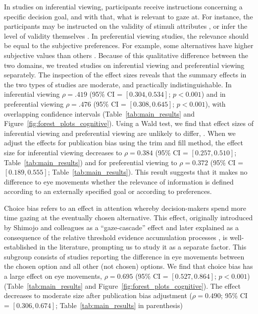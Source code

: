 \documentclass[english,natbib,man,floatsintext]{apa6}
\begin{document}
In studies on inferential viewing, participants receive instructions concerning a specific decision goal, and with that, what is relevant to gaze at. For instance, the participants may be instructed on the validity of stimuli attributes \citep{krefeld-schwalb2019a}, or infer the level of validity themselves \citep{bialkova2014a}. In preferential viewing studies, the relevance should be equal to the subjective preferences. For example, some alternatives have higher subjective values than others \citep{kim2012a}. Because of this qualitative difference between the two domains, we treated studies on inferential viewing and preferential viewing separately. The inspection of the effect sizes reveals that the summary effects in the two types of studies are moderate, and practically indistinguishable. In inferential viewing $\rho = .419$ (95\% CI = $[0.304,0.534]$; $p<0.001$) and in preferential viewing $\rho = .476$ (95\% CI = $[0.308,0.645]$; $p<0.001$), with overlapping confidence intervals (Table~\ref{tab:main_results} and Figure~\ref{fig:forest_plots_cognitive}). Using a Wald test, we find that effect sizes of inferential viewing and preferential viewing are unlikely to differ, . When we adjust the effects for publication bias using the trim and fill method, the effect size for inferential viewing decreases to $\rho = 0.384$ (95\% CI = $[0.257,0.510]$; Table~\ref{tab:main_results}) and for preferential viewing to $\rho = 0.372$ (95\% CI = $[0.189,0.555]$; Table~\ref{tab:main_results}). This result suggests that it makes no difference to eye movements whether the relevance of information is defined according to an externally specified goal or according to preferences. 

Choice bias refers to an effect in attention whereby decision-makers spend more time gazing at the eventually chosen alternative. This effect, originally introduced by Shimojo and colleagues \citep{shimojo2003a} as a ``gaze-cascade'' effect and later explained as a consequence of the relative threshold evidence accumulation processes \citep{mullett2016a,krajbich2010a}, is well-established in the literature, prompting us to study it as a separate factor. This subgroup consists of studies reporting the difference in eye movements between the chosen option and all other (not chosen) options. We find that choice bias has a large effect on eye movements, $\rho = 0.695$ (95\% CI = $[0.527,0.864]$; $p<0.001$) (Table~\ref{tab:main_results} and Figure~\ref{fig:forest_plots_cognitive}). The effect decreases to moderate size after publication bias adjustment ($\rho = 0.490$; 95\% CI = $[0.306,0.674]$; Table~\ref{tab:main_results} in parenthesis)
\end{document}
